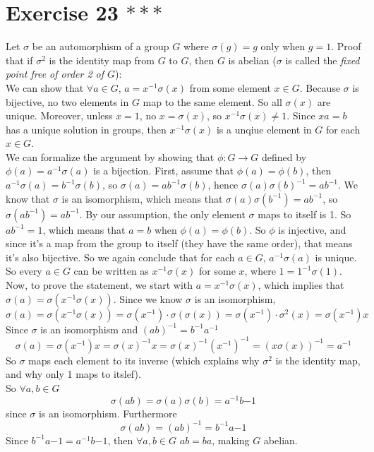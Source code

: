 \documentclass{article}
\begin{document}
    \section*{Exercise 23 $***$}
    Let $\sigma$ be an automorphism of a group $G$
    where $\sigma(g) = g$ only when $g = 1$.
    Proof that if $\sigma^2$ is the identity map from $G$ to $G$,
    then $G$ is abelian
    ($\sigma$ is called the \textit{fixed point free of order 2 of $G$}): \\
    We can show that $\forall a \in G$, $a = x^{-1}\sigma(x)$
    from some element $x \in G$.
    Because $\sigma$ is bijective,
    no two elements in $G$ map to the same element.
    So all $\sigma(x)$ are unique.
    Moreover, unless $x = 1$, no $x = \sigma(x)$,
    so $x^{-1}\sigma(x) \neq 1$.
    Since $xa = b$ has a unique solution in groups, 
    then $x^{-1}\sigma(x)$ is a unqiue element in $G$ for each $x \in G$. \\
    We can formalize the argument by showing that $\phi: G \to G$
    defined by $\phi(a) = a^{-1}\sigma(a)$ is a bijection.
    First, assume that $\phi(a) = \phi(b)$,
    then $a^{-1}\sigma(a) = b^{-1}\sigma(b)$,
    so $\sigma(a) = ab^{-1}\sigma(b)$,
    hence $\sigma(a)\sigma(b)^{-1} = ab^{-1}$.
    We know that $\sigma$ is an isomorphism,
    which means that $\sigma(a)\sigma(b^{-1}) = ab^{-1}$,
    so $\sigma(ab^{-1}) = ab^{-1}$.
    By our assumption, the only element $\sigma$ maps to itself is 1.
    So $ab^{-1} = 1$,
    which means that $a = b$ when $\phi(a) = \phi(b)$.
    So $\phi$ is injective,
    and since it's a map from the group to itself (they have the same order),
    that means it's also bijective.
    So we again conclude that for each $a \in G$, $a^{-1}\sigma(a)$ is unique.
    So every $a \in G$ can be written as $x^{-1}\sigma(x)$ for some $x$,
    where $1 = 1^{-1}\sigma(1)$. \\
    Now, to prove the statement, we start with $a = x^{-1}\sigma(x)$,
    which implies that $\sigma(a) = \sigma(x^{-1}\sigma(x))$.
    Since we know $\sigma$ is an isomorphism,
    \[ \sigma(a) = \sigma(x^{-1}\sigma(x))
    = \sigma(x^{-1}) \cdot \sigma(\sigma(x))
    = \sigma(x^{-1}) \cdot \sigma^2(x)
    = \sigma(x^{-1})x \]
    Since $\sigma$ is an isomorphism and $(ab)^{-1} = b^{-1}a^{-1}$
    \[\sigma(a) = \sigma(x^{-1})x
    = \sigma(x)^{-1}x
    = \sigma(x)^{-1}(x^{-1})^{-1}
    = (x\sigma(x))^{-1}
    = a^{-1} \]
    So $\sigma$ maps each element to its inverse
    (which explains why $\sigma^2$ is the identity map, and why only 1
    maps to itslef). \\ 
    So $\forall a, b \in G$
    \[ \sigma(ab) = \sigma(a)\sigma(b) = a^{-1}b{-1} \]
    since $\sigma$ is an isomorphism.
    Furthermore
    \[ \sigma(ab) = (ab)^{-1} = b^{-1}a{-1} \]
    Since $b^{-1}a{-1} = a^{-1}b{-1}$,
    then $\forall a, b \in G$ $ab = ba$,
    making $G$ abelian.
\end{document}
